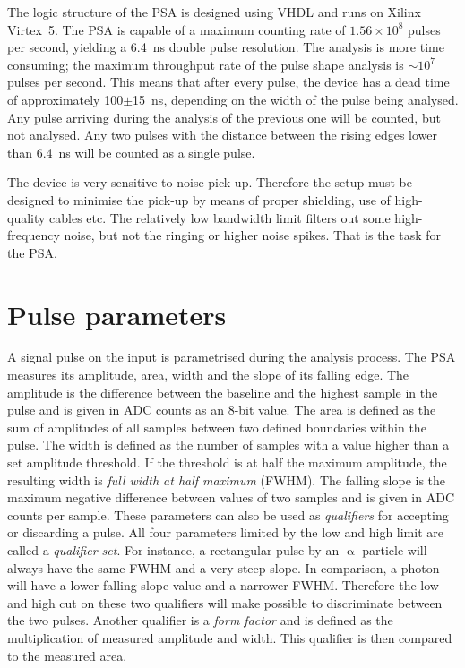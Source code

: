 \documentclass[12pt]{mytustyle}  %
\begin{document}
The logic structure of the PSA is designed using VHDL and runs on Xilinx Virtex~5. The PSA is capable of a maximum counting rate of $1.56\times10^8$ pulses per second, yielding a 6.4~ns double pulse resolution. The analysis is more time consuming; the maximum throughput rate of the pulse shape analysis is $\sim10^7$ pulses per second. This means that after every pulse, the device has a dead time of approximately 100$\pm$15~ns, depending on the width of the pulse being analysed. Any pulse arriving during the analysis of the previous one will be counted, but not analysed. Any two pulses with the distance between the rising edges lower than 6.4~ns will be counted as a single pulse.

The device is very sensitive to noise pick-up. Therefore the setup must be designed to minimise the pick-up by means of proper shielding, use of high-quality cables etc. The relatively low bandwidth limit filters out some high-frequency noise, but not the ringing or higher noise spikes. That is the task for the PSA.

\section{Pulse parameters}
A signal pulse on the input is parametrised during the analysis process. The PSA measures its amplitude, area, width and the slope of its falling edge. The amplitude is the difference between the baseline and the highest sample in the pulse and is given in ADC counts as an 8-bit value. The area is defined as the sum of amplitudes of all samples between two defined boundaries within the pulse. The width is defined as the number of samples with a value higher than a set amplitude threshold. If the threshold is at half the maximum amplitude, the resulting width is \emph{full width at half maximum} (FWHM). The falling slope is the maximum negative difference between values of two samples and is given in ADC counts per sample. These parameters can also be used as \emph{qualifiers} for accepting or discarding a pulse. All four parameters limited by the low and high limit are called a \emph{qualifier set}. For instance, a rectangular pulse by an $\upalpha$ particle will always have the same FWHM and a very steep slope. In comparison, a photon will have a lower falling slope value and a narrower FWHM. Therefore the low and high cut on these two qualifiers will make possible to discriminate between the two pulses. Another qualifier is a \emph{form factor} and is defined as the multiplication of measured amplitude and width. This qualifier is then compared to the measured area.
\end{document}

